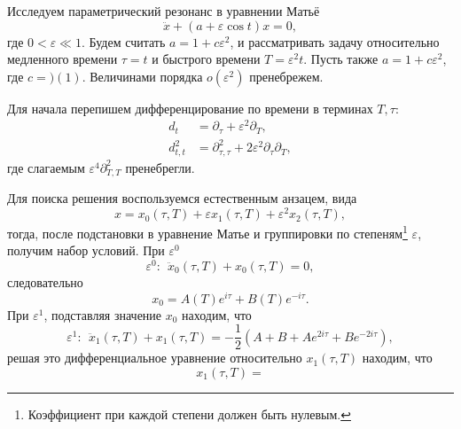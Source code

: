 Исследуем параметрический резонанс в уравнении Матьё
\begin{equation*}
    \ddot{x} + (a + \varepsilon \cos t) x = 0,
\end{equation*}
где $0 < \varepsilon \ll 1$. Будем считать $a = 1 + c \varepsilon^2$, и рассматривать задачу относительно медленного времени $\tau = t$ и быстрого времени $T = \varepsilon^2 t$. Пусть также $a = 1 + c \varepsilon^2$, где $c = )(1)$. Величинами порядка $o(\varepsilon^2)$ пренебрежем.

Для начала перепишем дифференцирование по времени в терминах $T, \tau$:
\begin{align*}
    d_t &= \partial_\tau + \varepsilon^2 \partial_T, \\
    d^2_{t, t} &= 
    \partial^2_{\tau, \tau} + 2 \varepsilon^2 \partial_\tau \partial_T,
\end{align*}
где слагаемым $\varepsilon^4 \partial^2_{T, T}$ пренебрегли. 

Для поиска решения воспользуемся естественным анзацем, вида
\begin{equation*}
    x = x_0(\tau, T) + \varepsilon x_1 (\tau, T) + \varepsilon^2 x_2 (\tau, T),
\end{equation*}
тогда, после подстановки в уравнение Матье и группировки по степеням\footnote{
    Коэффициент при каждой степени должен быть нулевым.
}  $\varepsilon$, получим набор условий. При $\varepsilon^0$
\begin{equation*}
    \varepsilon^0 \colon \ \ \ddot{x}_0(\tau, T) +  x_0(\tau, T) = 0,
\end{equation*}
следовательно
\begin{equation*}
    x_0 = A(T) e^{i\tau} + B(T) e^{-i\tau}.
\end{equation*}
При $\varepsilon^1$, подставляя значение $x_0$ находим, что
\begin{equation*}
    \varepsilon^1 \colon \ \ \ddot{x}_1(\tau, T) +  x_1(\tau, T) 
    = -\frac{1}{2}\left(
        A+B + A e^{2 i \tau} + B e^{- 2 i \tau}
    \right)
    ,
\end{equation*}
решая это дифференциальное уравнение относительно $x_1(\tau, T)$ находим, что
\begin{equation*}
    x_1(\tau, T) = 
\end{equation*}